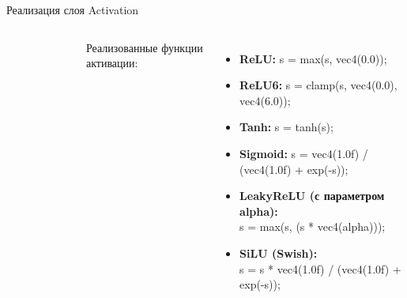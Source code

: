 \documentclass[aspectratio=169,xcolor=dvipsnames]{beamer}
\begin{document}

\begin{frame}{Реализация слоя Activation}
    \begin{columns}[] %

        \begin{figure}[h]
            \label{ris:ORTModelData}
        \end{figure}

        Реализованные функции активации:
        \begin{itemize}
            \item \textbf{ReLU:} s = max(s, vec4(0.0));
            \item \textbf{ReLU6:} s = clamp(s, vec4(0.0), vec4(6.0));
            \item \textbf{Tanh:} s = tanh(s);
            \item \textbf{Sigmoid:} s = vec4(1.0f) / (vec4(1.0f) + exp(-s));
            \item \textbf{LeakyReLU (с параметром alpha):}\\ s = max(s, (s * vec4(alpha)));
            \item \textbf{SiLU (Swish):}\\ s = s * vec4(1.0f) / (vec4(1.0f) + exp(-s));
        \end{itemize}
    \end{columns}
\end{frame}
\end{document}
